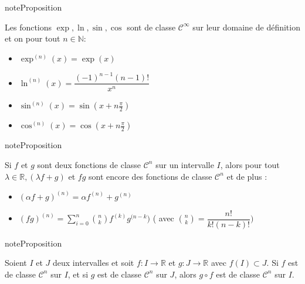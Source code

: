 \documentclass[letterpaper,10pt,french]{jupyterBook}
\begin{document}
\begin{sphinxadmonition}{note}{Proposition}

\sphinxAtStartPar
Les fonctions \(\exp, \ln, \sin, \cos\) sont de classe \(\mathscr{C}^\infty\) sur leur domaine de définition et on pour tout \(n\in \mathbb{N}\):
\begin{itemize}
\item {} 
\sphinxAtStartPar
\(\exp^{(n)}(x) = \exp(x)\)

\item {} 
\sphinxAtStartPar
\(\ln^{(n)}(x) = \dfrac{(-1)^{n-1}(n-1)!}{x^{n}}\)

\item {} 
\sphinxAtStartPar
\(\sin^{(n)}(x) = \sin(x+n\frac{\pi}{2})\)

\item {} 
\sphinxAtStartPar
\(\cos^{(n)}(x) = \cos(x+ n\frac{\pi}{2})\)

\end{itemize}
\end{sphinxadmonition}

\begin{sphinxadmonition}{note}{Proposition}

\sphinxAtStartPar
Si \(f\) et \(g\) sont deux fonctions de classe \(\mathscr{C}^n\) sur un intervalle \(I\), alors pour tout \(\lambda\in \mathbb{R}, (\lambda f + g)\) et \(fg\) sont encore des fonctions de classe \(\mathscr{C}^n\) et de plus :
\begin{itemize}
\item {} 
\sphinxAtStartPar
\((αf + g)^{(n)} = αf^{(n)} + g^{(n)}\)

\item {} 
\sphinxAtStartPar
\((fg)^{(n)} = \sum_{i=0}^{n} \binom{n}{k}f^{(k)}g^{(n-k})\) ( avec \(\binom{n}{k} =\dfrac{n!}{k!(n-k)!})\)

\end{itemize}
\end{sphinxadmonition}

\begin{sphinxadmonition}{note}{Proposition}

\sphinxAtStartPar
Soient \(I\) et \(J\) deux intervalles et soit \(f : I \to \mathbb{R}\) et \(g : J \to \mathbb{R}\) avec \(f(I) \subset J\).
Si \(f\) est de classe \(\mathscr{C}^n\) sur \(I\), et si \(g\) est de classe \(\mathscr{C}^n\) sur \(J\), alors \(g\circ f\) est de classe \(\mathscr{C}^n\) sur \(I\).
\end{sphinxadmonition}
\end{document}
